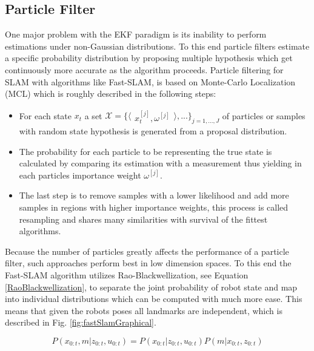 
\subsection{Particle Filter}
One major problem with the EKF paradigm is its inability to perform estimations under non-Gaussian distributions. 
To this end particle filters estimate a specific probability distribution by proposing multiple hypothesis which get continuously more accurate as the algorithm proceeds. 
Particle filtering for SLAM with algorithms like Fast-SLAM, is based on Monte-Carlo Localization (MCL) which is roughly described in the following steps:
\begin{itemize}
	\item For each state $ x_{t} $ a set 
	$
	\mathcal{X} = 
	\{ 
	\langle
	\begin{matrix}
		 x_{t}^{[j]},  \omega^{[j]}
	\end{matrix}
	\rangle
	, ...
	\}
	_{j=1, ..., J}
	$
	of particles or samples 
	with random state hypothesis is generated from a proposal distribution. %
	\item The probability for each particle to be representing the true state is calculated by comparing its estimation with a measurement thus yielding in each particles importance weight $ \omega^{[j]} $.
	\item The last step is to remove samples with a lower likelihood and add more samples in regions with higher importance weights, this process is called resampling and shares many similarities with survival of the fittest algorithms.
\end{itemize}

Because the number of particles greatly affects the performance of a particle filter, such approaches perform best in low dimension spaces. To this end the Fast-SLAM algorithm utilizes Rao-Blackwellization, see Equation \ref{RaoBlackwellization}, to separate the joint probability of robot state and map into individual distributions which can be computed with much more ease.
This means that given the robots poses all landmarks are independent, which is described in Fig. \ref{fig:fastSlamGraphical}.

\begin{equation}\label{RaoBlackwellization}
	P(x_{0:t}, m | z_{0:t}, u_{0:t}) = P(x_{0:t} | z_{0:t}, u_{0:t}) P(m | x_{0:t}, z_{0:t})
\end{equation}


